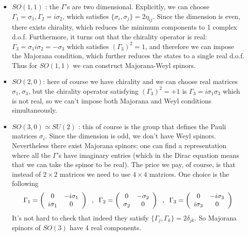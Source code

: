 \documentclass[a4paper,12pt]{article}
\numberwithin{equation}{section}
\numberwithin{exe}{section}
\newcommand{\G}{{\Gamma}}
\begin{document}
	\begin{itemize}
	\item $SO(1,1)$ : the $\G$'s are two dimensional. Explicitly, we can choose $\G_1=\sigma_1,\G_2=i\sigma_2$, which satisfies $\{ \sigma_i,\sigma_j \}=2\eta_{ij}$. Since the dimension is even, there exists chirality, which reduces the minimum components to 1 complex d.o.f. Furthermore, it turns out that the chirality operator is real: $\G_3=\sigma_1 i\sigma_2=-\sigma_3$ which satisfies $\left( \G_3 \right)^2=1$, and therefore we can impose the Majorana condition, which further reduces the states to a single real d.o.f. Thus for $SO(1,1)$ we can construct Majorana-Weyl spinors.  
	\item $SO(2,0)$: here of course we have chirality and we can choose real matrices $\sigma_1,\sigma_3$, but the chirality operator satisfying $\left( \G_3 \right)^2=+1$ is $\G_3=i\sigma_1\sigma_3$ which is not real, so we can't impose both Majorana and Weyl conditions simultaneously.
	\item $SO(3,0)\simeq SU(2)$ : this of course is the group that defines the Pauli matrices $\sigma_i$. Since the dimension is odd, we don't have Weyl spinors. Nevertheless there exist Majorana spinors: one can find a representation where all the $\G$'s have imaginary entries (which in the Dirac equation means that we can take the spinor to be real). The price we pay, of course, is that instead of $2\times 2$ matrices we need to use $4\times 4$ matrices. One choice is the following
		\begin{align}\label{}
		\G_1= \left(
			\begin{array}{cc} 0 & -i\sigma_1 \\
			i\sigma_1 & 0  \end{array}
		\right)\hspace{.2cm},\hspace{.2cm} \G_2= \left(
			\begin{array}{cc} 0 & -\sigma_2 \\
			\sigma_2 & 0  \end{array}
		\right) \hspace{.2cm},\hspace{.2cm} \G_3= \left(
			\begin{array}{cc} 0 & -i\sigma_3 \\
			i\sigma_3 & 0  \end{array}
		\right)
		\end{align}
It's not hard to check that indeed they satisfy $\{ \G_j,\G_k \}=2\delta_{jk}$. So Majorana spinors of $SO(3)$ have $4$ real components.

\end{itemize}
\end{document}
